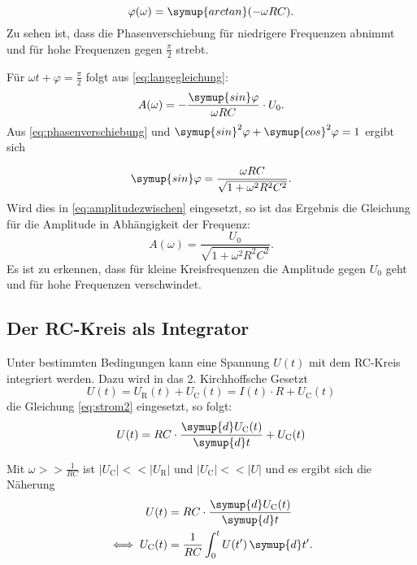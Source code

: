 \begin{equation}
\varphi(\omega) = \symup{arctan}(-\omega RC).
\label{eq:phasenverschiebung}
\end{equation}
Zu sehen ist, dass die Phasenverschiebung für niedrigere Frequenzen abnimmt und für hohe Frequenzen gegen $\frac{\pi}{2}$ strebt.

Für $\omega t + \varphi = \frac{\pi}{2}$ folgt aus \eqref{eq:langegleichung}:
\begin{equation}
A(\omega) = -\frac{\symup{sin}\varphi}{\omega RC}\cdot U_0.
\label{eq:amplitudezwischen}
\end{equation}
Aus \eqref{eq:phasenverschiebung} und $\symup{sin}^2 \varphi + \symup{cos}^2 \varphi = 1$ ergibt sich

\begin{equation}
\symup{sin}\varphi = \frac{\omega RC}{\sqrt{1+\omega^2 R^2 C^2}}.
\end{equation}
Wird dies in \eqref{eq:amplitudezwischen} eingesetzt, so ist das Ergebnis die Gleichung für die Amplitude in Abhängigkeit der Frequenz:
\begin{equation}
A(\omega) = \frac{U_0}{\sqrt{1+\omega^2 R^2 C^2}}.
\end{equation}
Es ist zu erkennen, dass für kleine Kreisfrequenzen die Amplitude gegen $U_0$ geht und für hohe Frequenzen verschwindet.


\subsection{Der RC-Kreis als Integrator}

Unter bestimmten Bedingungen kann eine Spannung $U(t)$ mit dem RC-Kreis integriert werden. Dazu wird in das 2. Kirchhoffsche Gesetzt
\begin{equation}
U(t) = U_{\text{R}}(t) + U_{\text{C}}(t) = I(t)\cdot R + U_{\text{C}}(t)
\end{equation}
die Gleichung \eqref{eq:strom2} eingesetzt, so folgt:
\begin{equation}
U(t) = RC\cdot \frac{\symup{d}U_{\text{C}}(t)}{\symup{d}t} + U_{\text{C}}(t) \\
\end{equation}

Mit $\omega >> \frac{1}{RC}$ ist $|U_{\text{C}}| << |U_{\text{R}}|$ und $|U_{\text{C}}| << |U|$ und es ergibt sich die Näherung
\begin{equation}
\begin{aligned}
U(t) &= RC\cdot \frac{\symup{d}U_{\text{C}}(t)}{\symup{d}t} \\
\iff U_{\text{C}}(t) &= \frac{1}{RC} \int_0^t U(t')\, \symup{d}t'.
\end{aligned}
\end{equation}